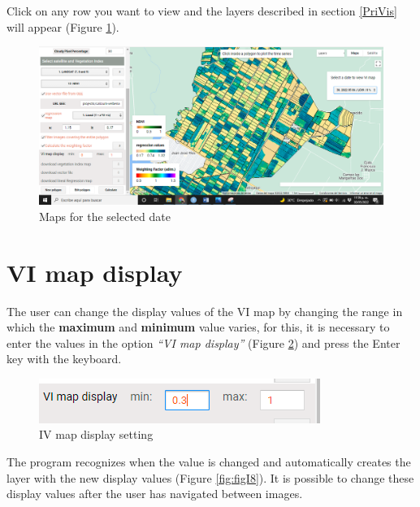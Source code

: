 \documentclass[
]{book}
\begin{document}
Click on any row you want to view and the layers described in section \ref{PriVis} will appear (Figure \ref{fig:figI6}).

\begin{figure}

{\centering \includegraphics[width=0.85\linewidth]{./images/Figure56} 

}

\caption{Maps for the selected date}\label{fig:figI6}
\end{figure}

\hypertarget{vi-map-display}{%
\section{VI map display}\label{vi-map-display}}

The user can change the display values of the VI map by changing the range in which the \textbf{maximum} and \textbf{minimum} value varies, for this, it is necessary to enter the values in the option \emph{``VI map display''} (Figure \ref{fig:figI7}) and press the Enter key with the keyboard.

\begin{figure}

{\centering \includegraphics{./images/Figure57} 

}

\caption{IV map display setting}\label{fig:figI7}
\end{figure}

The program recognizes when the value is changed and automatically creates the layer with the new display values (Figure \ref{fig:figI8}). It is possible to change these display values after the user has navigated between images.
\end{document}
